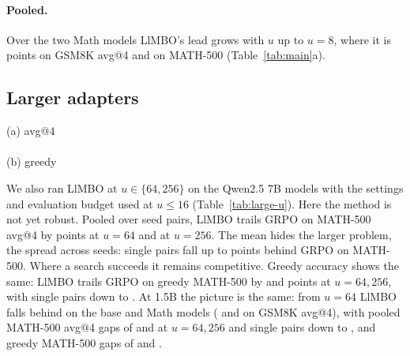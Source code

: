 \documentclass[twoside]{article}
\newcommand{\llmbo}{LlMBO}
\begin{document}
\paragraph{Pooled.} Over the two Math models \llmbo{}'s lead grows with $u$ up to $u = 8$, where it is \poolToneMeanUEightGsmMathVariants{} points on GSM8K avg@4 and \poolToneMeanUEightMathFiveMathVariants{} on MATH-500 (Table~\ref{tab:main}a).

\FloatBarrier
\subsection{Larger adapters}
\label{sec:large-u}

\begin{table}[!htbp]
\centering
\caption{Avg@4 (a) and greedy (b) accuracy at the end of training, for the \nLargeModels{} Qwen2.5 7B models (row blocks), per $u \in \{64, 256\}$ (rows) and benchmark (columns: in-distribution GSM8K and MATH-500, then the four out-of-distribution benchmarks); \llmbo{} is trained on the metric of each subtable (greedy: Section~\ref{sec:greedy-objective}). \emph{base}: accuracy of the base model in that metric (\%). \emph{GRPO}, \emph{\llmbo{}}: gain over the base model (points), mean over seeds (3 per cell); bold: the larger, unless tied. $\Delta$: paired gap \llmbo{} $-$ GRPO, mean $\pm$ s.e.\ over the seed pairs both have, so it can differ from the difference of the two gains; tint: its sign and size (green: \llmbo{} ahead).}
\label{tab:large-u}
{\small (a) avg@4}\\[0.2em]
\resizebox{\linewidth}{!}{}\\[0.8em]
{\small (b) greedy}\\[0.2em]
\resizebox{\linewidth}{!}{}
\end{table}

We also ran \llmbo{} at $u \in \{64, 256\}$ on the Qwen2.5 7B models with the settings and evaluation budget used at $u \le 16$ (Table~\ref{tab:large-u}). Here the method is not yet robust. Pooled over seed pairs, \llmbo{} trails GRPO on MATH-500 avg@4 by \poolToneMeanUSixtyFourMathFiveLargeU{} points at $u = 64$ and \poolToneMeanUTwoFiftySixMathFiveLargeU{} at $u = 256$. The mean hides the larger problem, the spread across seeds: single pairs fall up to \worstToneMeanLargeMathFive{} points behind GRPO on MATH-500. Where a search succeeds it remains competitive. Greedy accuracy shows the same: \llmbo{} trails GRPO on greedy MATH-500 by \poolGreedyGreedyUSixtyFourMathFiveLargeU{} and \poolGreedyGreedyUTwoFiftySixMathFiveLargeU{} points at $u = 64, 256$, with single pairs down to \worstGreedyGreedyLargeMathFive{}.
At 1.5B the picture is the same: from $u = 64$ \llmbo{} falls behind on the base and Math models (\gapToneMeanQwenSmallUSixtyFourGsm{} and \gapToneMeanMathSmallUSixtyFourGsm{} on GSM8K avg@4), with pooled MATH-500 avg@4 gaps of \poolToneMeanUSixtyFourMathFiveLargeUSmall{} and \poolToneMeanUTwoFiftySixMathFiveLargeUSmall{} at $u = 64, 256$ and single pairs down to \worstToneMeanLargeMathFiveSmall{}, and greedy MATH-500 gaps of \poolGreedyGreedyUSixtyFourMathFiveLargeUSmall{} and \poolGreedyGreedyUTwoFiftySixMathFiveLargeUSmall{}.
\end{document}
